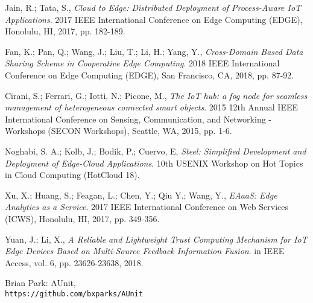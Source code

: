 \documentclass[a4paper,12pt,oneside]{book}
\begin{document}
\begin{thebibliography}{9}
	Jain, R.; Tata, S., 
	\textit{Cloud to Edge: Distributed Deployment of Process-Aware IoT Applications}. 
	2017 IEEE International Conference on Edge Computing (EDGE), Honolulu, HI, 2017, pp. 182-189.
	
	Fan, K.; Pan, Q.; Wang, J.; Liu, T.; Li, H.; Yang, Y., 
	\textit{Cross-Domain Based Data Sharing Scheme in Cooperative Edge Computing}. 
	2018 IEEE International Conference on Edge Computing (EDGE), San Francisco, CA, 2018, pp. 87-92.
	
	Cirani, S.; Ferrari, G.; Iotti, N.; Picone, M., 
	\textit{The IoT hub: a fog node for seamless management of heterogeneous connected smart objects}. 
	2015 12th Annual IEEE International Conference on Sensing, Communication, and Networking - Workshops (SECON Workshops), Seattle, WA, 2015, pp. 1-6.
	
	Noghabi, S. A.; Kolb, J.; Bodik, P.; Cuervo, E, 
	\textit{Steel: Simplified Development and Deployment of Edge-Cloud Applications}. 
	10th {USENIX} Workshop on Hot Topics in Cloud Computing (HotCloud 18).
	
	Xu, X.; Huang, S.; Feagan, L.; Chen, Y.; Qiu Y.; Wang, Y., 
	\textit{EAaaS: Edge Analytics as a Service}.
	2017 IEEE International Conference on Web Services (ICWS), Honolulu, HI, 2017, pp. 349-356.
	
	Yuan, J.; Li, X., 
	\textit{A Reliable and Lightweight Trust Computing Mechanism for IoT Edge Devices Based on Multi-Source Feedback Information Fusion}. 
	in IEEE Access, vol. 6, pp. 23626-23638, 2018.
	
	Brian Park: AUnit,
	\\\texttt{https://github.com/bxparks/AUnit}
	
	
\end{thebibliography}
\end{document}
